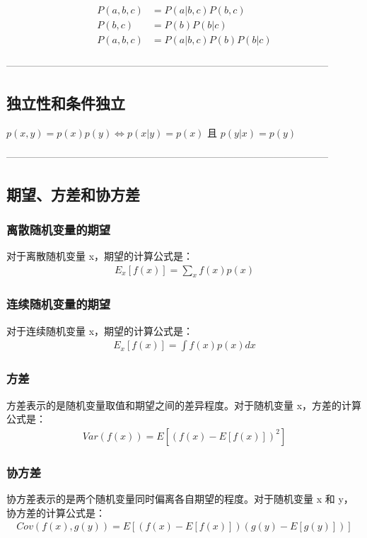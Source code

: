 \documentclass{article}
\begin{document}
$$
\begin{aligned}
    P(a,b,c) &= P(a|b,c)P(b,c) \\
    P(b,c) &= P(b)P(b|c) \\
    P(a,b,c) &= P(a|b,c)P(b)P(b|c)
\end{aligned}
$$

--------------------------------------------------------------------------------------------------
\subsection{独立性和条件独立}
$p(x,y) = p(x)p(y) \Leftrightarrow p(x|y)=p(x) \text{ 且 } p(y|x)=p(y)$

--------------------------------------------------------------------------------------------------
\subsection{期望、方差和协方差}

\subsubsection{离散随机变量的期望}
对于离散随机变量 x，期望的计算公式是：
$$
\begin{aligned}
E_{x}[f(x)] = \sum_x f(x)p(x)
\end{aligned}
$$

\subsubsection{连续随机变量的期望}
对于连续随机变量 x，期望的计算公式是：
$$
\begin{aligned}
E_{x}[f(x)] = \int f(x)p(x)dx
\end{aligned}
$$

\subsubsection{方差}
方差表示的是随机变量取值和期望之间的差异程度。对于随机变量 x，方差的计算公式是：
$$
\begin{aligned}
Var(f(x)) = E[(f(x) - E[f(x)])^2]
\end{aligned}
$$

\subsubsection{协方差}
协方差表示的是两个随机变量同时偏离各自期望的程度。对于随机变量 x 和 y，协方差的计算公式是：
$$
\begin{aligned}
Cov(f(x), g(y)) = E[(f(x) - E[f(x)])(g(y) - E[g(y)])]
\end{aligned}
$$
\end{document}

